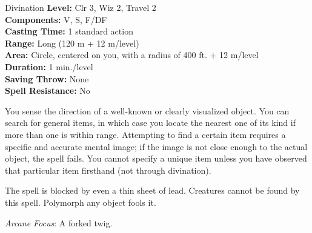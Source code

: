 {Divination}
{
	\textbf{Level:}
	Clr 3, Wiz 2, Travel 2\\
	\textbf{Components:}
	V, S, F/DF\\
	\textbf{Casting Time:}
	1 standard action\\
	\textbf{Range:}
	Long (120 m + 12 m/level)\\
	\textbf{Area:}
	Circle, centered on you, with a radius of 400 ft. + 12 m/level\\
	\textbf{Duration:}
	1 min./level\\
	\textbf{Saving Throw:}
	None\\
	\textbf{Spell Resistance:}
	No\\
}
{
	You sense the direction of a well-known or clearly visualized object. You can search for general items, in which case you locate the nearest one of its kind if more than one is within range. Attempting to find a certain item requires a specific and accurate mental image; if the image is not close enough to the actual object, the spell fails. You cannot specify a unique item unless you have observed that particular item firsthand (not through divination).

	The spell is blocked by even a thin sheet of lead. Creatures cannot be found by this spell. Polymorph any object fools it.

	\textit{Arcane Focus}:
	A forked twig.

}
